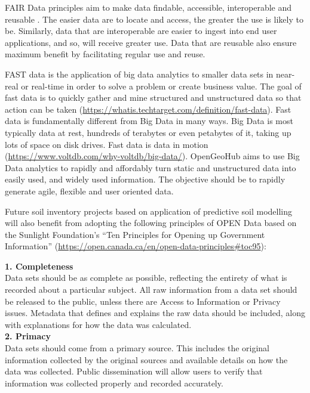 \documentclass[graybox,natbib,nospthms,UStrade]{svmono}
\begin{document}
FAIR Data principles aim to make data findable, accessible,
interoperable and reusable \citep{wilkinson2016fair}. The easier data are
to locate and access, the greater the use is likely to be. Similarly,
data that are interoperable are easier to ingest into end user
applications, and so, will receive greater use. Data that are reusable
also ensure maximum benefit by facilitating regular use and reuse.

FAST data is the application of big data analytics to smaller data sets
in near-real or real-time in order to solve a problem or create business
value. The goal of fast data is to quickly gather and mine structured
and unstructured data so that action can be taken
(\url{https://whatis.techtarget.com/definition/fast-data}).
Fast data is fundamentally different from Big Data in many ways. Big
Data is most typically data at rest, hundreds of terabytes or even
petabytes of it, taking up lots of space on disk drives. Fast data is
data in motion
(\url{https://www.voltdb.com/why-voltdb/big-data/}).
OpenGeoHub aims to use Big Data analytics to rapidly and affordably turn
static and unstructured data into easily used, and widely used
information. The objective should be to rapidly generate agile, flexible
and user oriented data.

Future soil inventory projects based on application of predictive soil
modelling will also benefit from adopting the following principles of
OPEN Data based on the Sunlight Foundation's ``Ten Principles for Opening
up Government Information''
(\url{https://open.canada.ca/en/open-data-principles\#toc95}):

\textbf{1. Completeness}\\
Data sets should be as complete as possible, reflecting the entirety of
what is recorded about a particular subject. All raw information from a
data set should be released to the public, unless there are Access to
Information or Privacy issues. Metadata that defines and explains the
raw data should be included, along with explanations for how the data
was calculated.\\

\textbf{2. Primacy}\\
Data sets should come from a primary source. This includes the original
information collected by the original sources and available details on
how the data was collected. Public dissemination will allow users to
verify that information was collected properly and recorded accurately.\\
\end{document}
